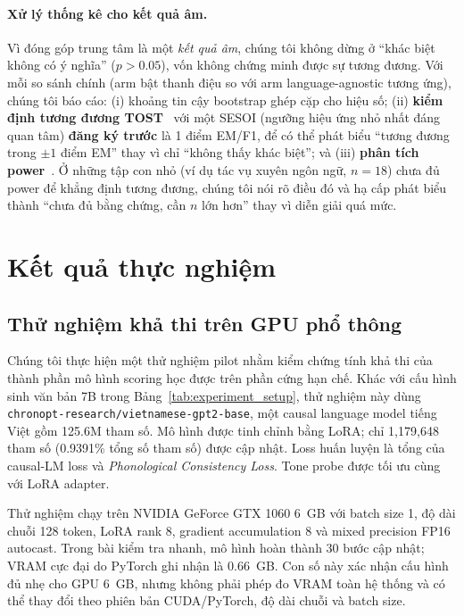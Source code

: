 \documentclass[12pt,a4paper]{article}
\begin{document}
\paragraph{Xử lý thống kê cho kết quả âm.} Vì đóng góp trung tâm là một \textit{kết quả âm}, chúng tôi không dừng ở ``khác biệt không có ý nghĩa'' ($p>0.05$), vốn không chứng minh được sự tương đương. Với mỗi so sánh chính (arm bật thanh điệu so với arm language-agnostic tương ứng), chúng tôi báo cáo: (i) khoảng tin cậy bootstrap ghép cặp cho hiệu số; (ii) \textbf{kiểm định tương đương TOST}~\cite{lakens2017equivalence} với một SESOI (ngưỡng hiệu ứng nhỏ nhất đáng quan tâm) \textbf{đăng ký trước} là 1 điểm EM/F1, để có thể phát biểu ``tương đương trong $\pm 1$ điểm EM'' thay vì chỉ ``không thấy khác biệt''; và (iii) \textbf{phân tích power}~\cite{card2020power}. Ở những tập con nhỏ (ví dụ tác vụ xuyên ngôn ngữ, $n{=}18$) chưa đủ power để khẳng định tương đương, chúng tôi nói rõ điều đó và hạ cấp phát biểu thành ``chưa đủ bằng chứng, cần $n$ lớn hơn'' thay vì diễn giải quá mức.


\section{Kết quả thực nghiệm}
\label{sec:results}

\subsection{Thử nghiệm khả thi trên GPU phổ thông}
\label{sec:slm_pilot}

Chúng tôi thực hiện một thử nghiệm pilot nhằm kiểm chứng tính khả thi của thành phần mô hình scoring học được trên phần cứng hạn chế. Khác với cấu hình sinh văn bản 7B trong Bảng~\ref{tab:experiment_setup}, thử nghiệm này dùng \texttt{chronopt-research/vietnamese-gpt2-base}, một causal language model tiếng Việt gồm 125.6M tham số. Mô hình được tinh chỉnh bằng LoRA; chỉ 1,179,648 tham số (0.9391\% tổng số tham số) được cập nhật. Loss huấn luyện là tổng của causal-LM loss và \textit{Phonological Consistency Loss}. Tone probe được tối ưu cùng với LoRA adapter.

Thử nghiệm chạy trên NVIDIA GeForce GTX 1060 6~GB với batch size 1, độ dài chuỗi 128 token, LoRA rank 8, gradient accumulation 8 và mixed precision FP16 autocast. Trong bài kiểm tra nhanh, mô hình hoàn thành 30 bước cập nhật; VRAM cực đại do PyTorch ghi nhận là 0.66~GB. Con số này xác nhận cấu hình đủ nhẹ cho GPU 6~GB, nhưng không phải phép đo VRAM toàn hệ thống và có thể thay đổi theo phiên bản CUDA/PyTorch, độ dài chuỗi và batch size.
\end{document}
